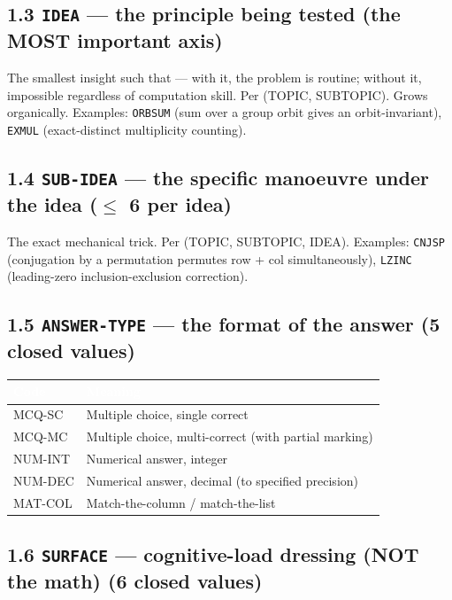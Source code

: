 \documentclass[11pt,letterpaper]{article}
\newcommand{\cd}[1]{\texttt{\small #1}}
\begin{document}
\subsection*{1.3 \cd{IDEA} --- the principle being tested (the MOST important axis)}

The smallest insight such that --- with it, the problem is routine; without it, impossible regardless of computation skill. Per (TOPIC, SUBTOPIC). Grows organically. Examples: \cd{ORBSUM} (sum over a group orbit gives an orbit-invariant), \cd{EXMUL} (exact-distinct multiplicity counting).

\subsection*{1.4 \cd{SUB-IDEA} --- the specific manoeuvre under the idea ($\leq$ 6 per idea)}

The exact mechanical trick. Per (TOPIC, SUBTOPIC, IDEA). Examples: \cd{CNJSP} (conjugation by a permutation permutes row + col simultaneously), \cd{LZINC} (leading-zero inclusion-exclusion correction).

\subsection*{1.5 \cd{ANSWER-TYPE} --- the format of the answer (5 closed values)}

\begin{tabular}{|p{2.1cm}|p{13.3cm}|}
\hline
\rowcolor{headergray}\textcolor{white}{\textbf{Code}} & \textcolor{white}{\textbf{Meaning}} \\
\hline
MCQ-SC & Multiple choice, single correct \\
\rowcolor{altrow}MCQ-MC & Multiple choice, multi-correct (with partial marking) \\
NUM-INT & Numerical answer, integer \\
\rowcolor{altrow}NUM-DEC & Numerical answer, decimal (to specified precision) \\
MAT-COL & Match-the-column / match-the-list \\
\hline
\end{tabular}

\subsection*{1.6 \cd{SURFACE} --- cognitive-load dressing (NOT the math) (6 closed values)}
\end{document}
